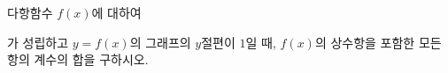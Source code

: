 다항함수 $f(x)$에 대하여 \par\smallskip{}\par\smallskip\noindent 가 성립하고 $y=f(x)$의 그래프의 $y$절편이 $1$일 때, $f(x)$의 상수항을 포함한 모든 항의 계수의 합을 구하시오. 
